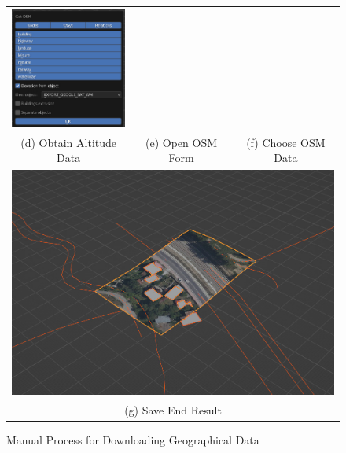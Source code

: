 \begin{figure}[H]
\begin{tabular}{ccc}
  \includegraphics[width=42mm]{src/img/manual-download/6-osm-settings.jpg} \\
  (d) Obtain Altitude Data &   
  (e) Open OSM Form &          
  (f) Choose OSM Data \\
  \multicolumn{3}{c}{ \includegraphics[width=130mm]{src/img/manual-download/7-end-result.jpg} }  \\ 
  \multicolumn{3}{c}{ (g) Save End Result }
 
\end{tabular}
\caption{Manual Process for Downloading Geographical Data}
\label{fig:manual-download-geo}
\end{figure}
